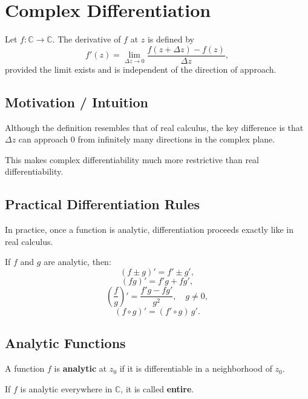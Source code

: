 \section{Complex Differentiation}

\begin{conceptbox}
    Let $f:\mathbb{C}\to\mathbb{C}$. The derivative of $f$ at $z$ is defined by
    \[
        f'(z)=\lim_{\Delta z\to 0}\frac{f(z+\Delta z)-f(z)}{\Delta z},
    \]
    provided the limit exists and is independent of the direction of approach.
\end{conceptbox}

\subsection*{Motivation / Intuition}

Although the definition resembles that of real calculus, the key difference is that $\Delta z$ can approach $0$ from infinitely many directions in the complex plane.

This makes complex differentiability much more restrictive than real differentiability.

\subsection*{Practical Differentiation Rules}

In practice, once a function is analytic, differentiation proceeds exactly like in real calculus.

\begin{conceptbox}
    If $f$ and $g$ are analytic, then:
    \[
        (f\pm g)'=f'\pm g',
    \]
    \[
        (fg)'=f'g+fg',
    \]
    \[
        \left(\frac{f}{g}\right)'=\frac{f'g-fg'}{g^2}, \quad g\neq 0,
    \]
    \[
        (f\circ g)'=(f'\circ g)\,g'.
    \]
\end{conceptbox}

\subsection*{Analytic Functions}

\begin{conceptbox}
    A function $f$ is \textbf{analytic} at $z_0$ if it is differentiable in a neighborhood of $z_0$.

    If $f$ is analytic everywhere in $\mathbb{C}$, it is called \textbf{entire}.
\end{conceptbox}

